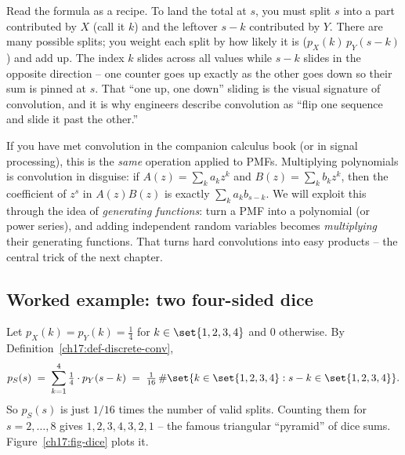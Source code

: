 \begin{happeningbox}
Read the formula as a recipe. To land the total at $s$, you must split $s$
into a part contributed by $X$ (call it $k$) and the leftover $s-k$
contributed by $Y$. There are many possible splits; you weight each split
by how likely it is ($p_X(k)\,p_Y(s-k)$) and add up. The index $k$ slides
across all values while $s-k$ slides in the opposite direction -- one
counter goes up exactly as the other goes down so their sum is pinned at
$s$. That ``one up, one down'' sliding is the visual signature of
convolution, and it is why engineers describe convolution as ``flip one
sequence and slide it past the other.''
\end{happeningbox}

\begin{connectionbox}
If you have met convolution in the companion calculus book (or in signal
processing), this is the \emph{same} operation applied to PMFs.
Multiplying polynomials is convolution in disguise: if
$A(z)=\sum_k a_k z^k$ and $B(z)=\sum_k b_k z^k$, then the coefficient of
$z^s$ in $A(z)B(z)$ is exactly $\sum_k a_k b_{s-k}$. We will exploit this
through the idea of \emph{generating functions}: turn a PMF into a
polynomial (or power series), and adding independent random variables
becomes \emph{multiplying} their generating functions. That turns hard
convolutions into easy products -- the central trick of the next chapter.
\end{connectionbox}

\subsection{Worked example: two four-sided dice}

Let $p_X(k)=p_Y(k)=\tfrac14$ for $k\in\set{1,2,3,4}$ and $0$ otherwise.
By Definition~\ref{ch17:def-discrete-conv},
\[
p_S(s) \;=\; \sum_{k=1}^{4} \tfrac14 \cdot p_Y(s-k)
        \;=\; \tfrac{1}{16}\,\#\set{k\in\set{1,2,3,4} : s-k \in \set{1,2,3,4}}.
\]
So $p_S(s)$ is just $1/16$ times the number of valid splits. Counting them
for $s=2,\dots,8$ gives $1,2,3,4,3,2,1$ -- the famous triangular
``pyramid'' of dice sums. Figure~\ref{ch17:fig-dice} plots it.

